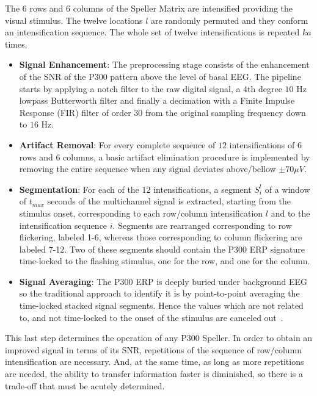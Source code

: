 \documentclass[utf8]{frontiersSCNS} %
\begin{document}

The $6$ rows and $6$ columns of the Speller Matrix are intensified providing the visual stimulus.  The twelve locations $l$ are randomly permuted and they conform an intensification sequence.  The whole set of twelve intensifications is repeated $ka$ times.


\begin{itemize}
\item \textbf{Signal Enhancement}: The preprocessing stage consists of the enhancement of the SNR of the P300 pattern above the level of basal EEG. The pipeline starts by applying a notch filter to the raw digital signal, a $4$th degree $10$ Hz lowpass Butterworth filter and finally a decimation with a Finite Impulse Response (FIR) filter of order $30$ from the original sampling frequency down to $16$ Hz\citep{Krusienski2006}.
\item \textbf{Artifact Removal}: For every complete sequence of $12$ intensifications of $6$ rows and $6$ columns, a basic artifact elimination procedure is implemented by removing the entire sequence when any signal deviates above/bellow $ \pm 70 \mu V $.
\item \textbf{Segmentation}: For each of the $12$ intensifications,  a segment $S_{i}^l$  of a window of $t_{max} $ seconds of the multichannel signal is extracted, starting from the stimulus onset, corresponding to each row/column intensification $l$ and to the intensification sequence $i$. Segments are rearranged corresponding to row flickering, labeled 1-6, whereas those corresponding to column flickering are labeled 7-12.  Two of these segments should contain the P300 ERP signature time-locked to the flashing stimulus, one for the row, and one for the column.
\item \textbf{Signal Averaging}:  The P300 ERP is deeply buried under background EEG so the traditional approach to identify it is by point-to-point averaging the time-locked stacked signal segments.  Hence the values which are not related to, and not time-locked to the onset of the stimulus are canceled out~\citep{Liang2008}.  
\end{itemize}

This last step determines the operation of any P300 Speller.  In order to obtain an improved signal in terms of its SNR,  repetitions of the sequence of row/column intensification are necessary.  And, at the same time, as long as more repetitions are needed, the ability to transfer information faster is diminished, so there is a trade-off that must be acutely determined.
\end{document}
